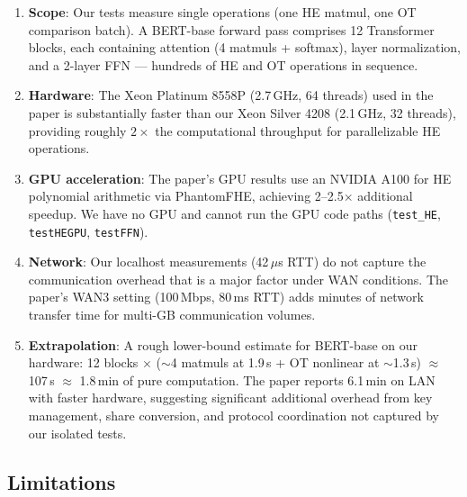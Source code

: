 \begin{enumerate}[nosep]
  \item \textbf{Scope}: Our tests measure single operations (one HE matmul, one OT comparison batch). A BERT-base forward pass comprises 12 Transformer blocks, each containing attention (4 matmuls + softmax), layer normalization, and a 2-layer FFN --- hundreds of HE and OT operations in sequence.
  \item \textbf{Hardware}: The Xeon Platinum 8558P (2.7\,GHz, 64 threads) used in the paper is substantially faster than our Xeon Silver 4208 (2.1\,GHz, 32 threads), providing roughly $2\times$ the computational throughput for parallelizable HE operations.
  \item \textbf{GPU acceleration}: The paper's GPU results use an NVIDIA A100 for HE polynomial arithmetic via PhantomFHE, achieving 2--2.5$\times$ additional speedup. We have no GPU and cannot run the GPU code paths (\texttt{test\_HE}, \texttt{testHEGPU}, \texttt{testFFN}).
  \item \textbf{Network}: Our localhost measurements (42\,$\mu$s RTT) do not capture the communication overhead that is a major factor under WAN conditions. The paper's WAN3 setting (100\,Mbps, 80\,ms RTT) adds minutes of network transfer time for multi-GB communication volumes.
  \item \textbf{Extrapolation}: A rough lower-bound estimate for BERT-base on our hardware: 12 blocks $\times$ ($\sim$4 matmuls at 1.9\,s + OT nonlinear at $\sim$1.3\,s) $\approx$ 107\,s $\approx$ 1.8\,min of pure computation. The paper reports 6.1\,min on LAN with faster hardware, suggesting significant additional overhead from key management, share conversion, and protocol coordination not captured by our isolated tests.
\end{enumerate}

\subsection{Limitations}

